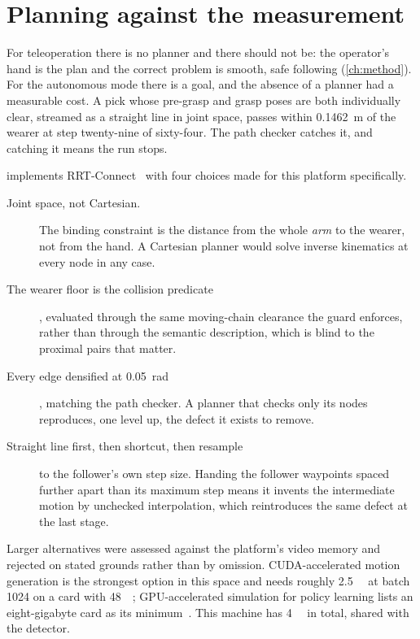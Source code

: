 \section{Planning against the measurement}

For teleoperation there is no planner and there should not be: the operator's
hand is the plan and the correct problem is smooth, safe following
(\cref{ch:method}). For the autonomous mode there is a goal, and the absence
of a planner had a measurable cost. A pick whose pre-grasp and grasp poses are
both individually clear, streamed as a straight line in joint space, passes
within \SI{0.1462}{\metre} of the wearer at step twenty-nine of sixty-four.
The path checker catches it, and catching it means the run stops.

 implements RRT-Connect~\cite{kuffner2000rrtconnect}
with four choices made for this platform specifically.

\begin{description}
  \item[Joint space, not Cartesian.] The binding constraint is the distance
    from the whole \emph{arm} to the wearer, not from the hand. A Cartesian
    planner would solve inverse kinematics at every node in any case.
  \item[The wearer floor is the collision predicate], evaluated through the
    same moving-chain clearance the guard enforces, rather than through the
    semantic description, which is blind to the proximal pairs that matter.
  \item[Every edge densified at \SI{0.05}{\radian}], matching the path
    checker. A planner that checks only its nodes reproduces, one level up,
    the defect it exists to remove.
  \item[Straight line first, then shortcut, then resample] to the follower's
    own step size. Handing the follower waypoints spaced further apart than
    its maximum step means it invents the intermediate motion by unchecked
    interpolation, which reintroduces the same defect at the last stage.
\end{description}

Larger alternatives were assessed against the platform's video memory and
rejected on stated grounds rather than by omission. CUDA-accelerated motion
generation is the strongest option in this space and needs roughly
\SI{2.5}{\gibi\byte} at batch 1024 on a card with \SI{48}{\gibi\byte};
GPU-accelerated simulation for policy learning lists an eight-gigabyte
card as its minimum~\cite{isaaclab}. This machine has \SI{4}{\gibi\byte} in
total, shared with the detector.

